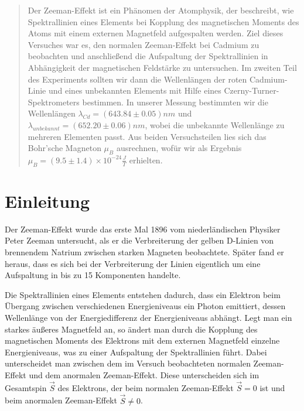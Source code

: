 \maketitle

\begin{abstract}
Der Zeeman-Effekt ist ein Phänomen der Atomphysik, der beschreibt, wie Spektrallinien eines Elements bei Kopplung des magnetischen Moments des Atoms mit einem externen Magnetfeld aufgespalten werden.
Ziel dieses Versuches war es, den normalen Zeeman-Effekt bei Cadmium zu beobachten und anschließend die Aufspaltung der Spektrallinien in Abhängigkeit der magnetischen Feldstärke zu untersuchen.
Im zweiten Teil des Experiments sollten wir dann die Wellenlängen der roten Cadmium-Linie und eines unbekannten Elements mit Hilfe eines Czerny-Turner-Spektrometers bestimmen. In unserer Messung bestimmten wir die Wellenlängen $\lambda_{Cd} = (643.84 \pm 0.05) nm$ und $\lambda_{unbekannt} = (652.20 \pm 0.06) nm$, wobei die unbekannte Wellenlänge zu mehreren Elementen passt.
Aus beiden Versuchsteilen lies sich das Bohr'sche Magneton $\mu_B$ ausrechnen, wofür wir als Ergebnis $\mu_B = (9.5 \pm 1.4) \times 10^{-24} \frac{J}{T}$ erhielten.

\end{abstract}



\section{Einleitung}
Der Zeeman-Effekt wurde das erste Mal 1896 vom niederländischen Physiker Peter Zeeman untersucht, als er die Verbreiterung der gelben D-Linien von brennendem Natrium zwischen starken Magneten beobachtete. Später fand er heraus, dass es sich bei der Verbreiterung der Linien eigentlich um eine Aufspaltung in bis zu 15 Komponenten handelte.

Die Spektrallinien eines Elements entstehen dadurch, dass ein Elektron beim Übergang zwischen verschiedenen Energieniveaus ein Photon emittiert, dessen Wellenlänge von der Energiedifferenz der Energieniveaus abhängt. Legt man ein starkes äußeres Magnetfeld an, so ändert man durch die Kopplung des magnetischen Moments des Elektrons mit dem externen Magnetfeld einzelne Energieniveaus, was zu einer Aufspaltung der Spektrallinien führt. Dabei unterscheidet man zwischen dem im Versuch beobachteten normalen Zeeman-Effekt und dem anormalen Zeeman-Effekt. Diese unterscheiden sich im Gesamtspin $\vec{S}$ des Elektrons, der beim normalen Zeeman-Effekt $\vec{S} = 0$ ist und beim anormalen Zeeman-Effekt $\vec{S} \ne 0$. 


